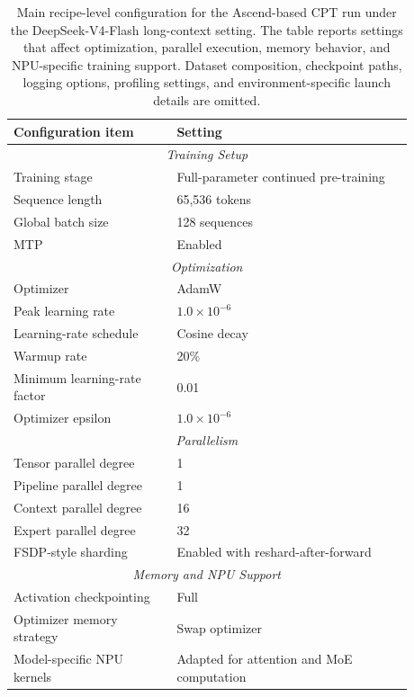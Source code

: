\begin{table}[H]
\centering
\small
\caption{Main recipe-level configuration for the Ascend-based CPT run under
the DeepSeek-V4-Flash long-context setting. The table reports settings
that affect optimization, parallel execution, memory behavior, and
NPU-specific training support. Dataset composition, checkpoint paths, logging
options, profiling settings, and environment-specific launch details are
omitted.}
\label{tab:cpt_training_recipe}
\begin{tabular}{p{0.36\linewidth}p{0.52\linewidth}}
\toprule
Configuration item & Setting \\
\midrule
\multicolumn{2}{c}{\textit{Training Setup}} \\
\midrule
Training stage & Full-parameter continued pre-training \\
Sequence length & 65,536 tokens \\
Global batch size & 128 sequences \\
MTP & Enabled \\
\midrule
\multicolumn{2}{c}{\textit{Optimization}} \\
\midrule
Optimizer & AdamW \\
Peak learning rate & $1.0\times10^{-6}$ \\
Learning-rate schedule & Cosine decay \\
Warmup rate & 20\% \\
Minimum learning-rate factor & 0.01 \\
Optimizer epsilon & $1.0\times10^{-6}$ \\
\midrule
\multicolumn{2}{c}{\textit{Parallelism}} \\
\midrule
Tensor parallel degree & 1 \\
Pipeline parallel degree & 1 \\
Context parallel degree & 16 \\
Expert parallel degree & 32 \\
FSDP-style sharding & Enabled with reshard-after-forward \\
\midrule
\multicolumn{2}{c}{\textit{Memory and NPU Support}} \\
\midrule
Activation checkpointing & Full \\
Optimizer memory strategy & Swap optimizer \\
Model-specific NPU kernels & Adapted for attention and MoE computation \\
\bottomrule
\end{tabular}
\end{table}
